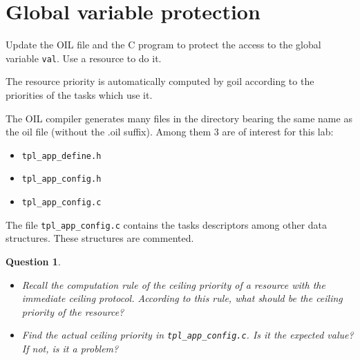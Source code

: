 \documentclass[11pt]{report}
\newtheorem{ex}{Question}
\newcommand{\unixcl}[1]{\texttt{\fcolorbox{black}{gray!20}{\footnotesize#1}}}
\begin{document}



\section{Global variable protection}


Update the OIL file and the C program to protect the access to the global variable \texttt{val}. Use a resource to do it.

The resource priority is automatically computed by goil according to the priorities of the tasks which use it.

The OIL compiler generates many files in the directory bearing the same name as the oil file (without the .oil suffix). Among them 3 are of interest for this lab:
\begin{itemize}
\item \texttt{tpl_app_define.h}
\item \texttt{tpl_app_config.h}
\item \texttt{tpl_app_config.c}
\end{itemize}

The file \texttt{tpl_app_config.c} contains the tasks descriptors among other data structures. These structures are commented.

\begin{ex} ~
    \begin{itemize}
        \item
            Recall the computation rule of the ceiling priority of a resource with the immediate ceiling protocol.
            According to this rule, what should be the ceiling priority of the resource?
        \item
            Find the actual ceiling priority in \texttt{tpl_app_config.c}. Is it the expected value? If not, is it a problem?
    \end{itemize}
\end{ex}


\end{document}
